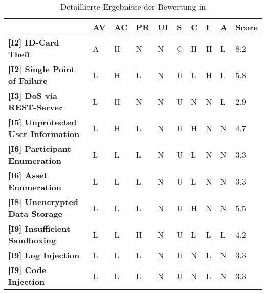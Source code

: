 \begin{sidewaystable}
\centering
\sffamily
\begin{tabularx}{\textwidth}{|l|X|X|X|X|X|X|X|X|l|}
\hline
\textbf{}                                      & \textbf{AV} & \textbf{AC} & \textbf{PR} & \textbf{UI} & \textbf{S} & \textbf{C} & \textbf{I} & \textbf{A} & \textbf{Score} \\ \hline
\textbf{{[}I2{]} ID-Card Theft}                & A           & H           & N           & N           & C          & H          & H          & L          & 8.2            \\ \hline
\textbf{{[}I2{]} Single Point of Failure}      & L           & H           & L           & N           & U          & L          & H          & L          & 5.8            \\ \hline
\textbf{{[}I3{]} DoS via REST-Server}          & L           & H           & N           & N           & U          & N          & N          & L          & 2.9            \\ \hline
\textbf{{[}I5{]} Unprotected User Information} & L           & H           & L           & N           & U          & H          & N          & N          & 4.7            \\ \hline
\textbf{{[}I6{]} Participant Enumeration}      & L           & L           & L           & N           & U          & L          & N          & N          & 3.3            \\ \hline
\textbf{{[}I6{]} Asset Enumeration}            & L           & L           & L           & N           & U          & L          & N          & N          & 3.3            \\ \hline
\textbf{{[}I8{]} Unencrypted Data Storage}     & L           & L           & L           & N           & U          & H          & N          & N          & 5.5            \\ \hline
\textbf{{[}I9{]} Insufficient Sandboxing}      & L           & L           & H           & N           & U          & L          & L          & L          & 4.2            \\ \hline
\textbf{{[}I9{]} Log Injection}                & L           & L           & L           & N           & U          & N          & L          & N          & 3.3            \\ \hline
\textbf{{[}I9{]} Code Injection}               & L           & L           & L           & N           & U          & N          & L          & N          & 3.3            \\ \hline
\end{tabularx}
\caption{Detaillierte Ergebnisse der Bewertung in }
\label{tab:eval_cvss_long}
\end{sidewaystable}


\newpage
